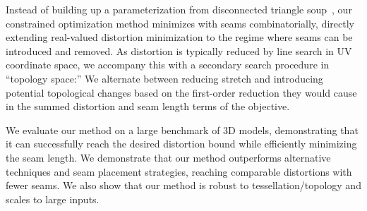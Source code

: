 %
%
Instead of building up a parameterization from disconnected triangle soup~\cite{Poranne2017Autocuts}, our constrained optimization method minimizes with seams combinatorially, directly extending real-valued distortion minimization to the regime where seams can be introduced and removed. As distortion is typically reduced by line search in UV coordinate space, we accompany this with a secondary search procedure in ``topology space:'' We alternate between reducing stretch and introducing potential topological changes based on the first-order reduction they would cause in the summed distortion and seam length terms of the objective. %


We evaluate our method on a large benchmark of 3D models, demonstrating that it can successfully reach the desired distortion bound while efficiently minimizing the seam length. We demonstrate that our method outperforms alternative techniques and seam placement strategies, reaching comparable distortions with fewer seams. We also show that our method is robust to tessellation/topology and scales to large inputs.%

